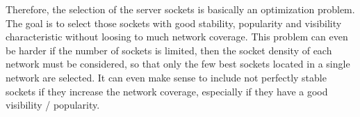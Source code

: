 Therefore, the selection of the \glspl{server socket} is basically an optimization problem. 
The goal is to select those sockets with good stability, popularity and visibility characteristic without loosing to much network coverage. 
This problem can even be harder if the number of sockets is limited, then the socket density of each network must be considered, so that only the few best sockets located in a single network are selected.
It can even make sense to include not perfectly 
stable sockets if they increase the network coverage, especially if they have a good visibility / popularity.
